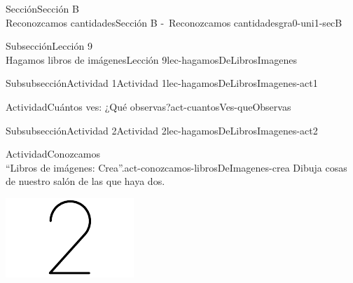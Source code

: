 \begin{sectionptx}{Sección}{{\Large Sección B\\}Reconozcamos cantidades}{}{Sección B -~Reconozcamos cantidades}{}{}{gra0-uni1-secB}
\begin{subsectionptx}{Subsección}{{\normalsize Lección 9\\[-0.05cm]}Hagamos libros de imágenes}{}{Lección 9}{}{}{lec-hagamosDeLibrosImagenes}
\begin{subsubsectionptx}{Subsubsección}{Actividad 1}{}{Actividad 1}{}{}{lec-hagamosDeLibrosImagenes-act1}
\begin{activity}{Actividad}{Cuántos ves: ¿Qué observas?}{act-cuantosVes-queObservas}
\begin{sidebyside}{2}{0}{0}{0}
\begin{sbspanel}{0.5}
\end{sbspanel}%
\end{sidebyside}%
\end{activity}%
\end{subsubsectionptx}
%
%
\typeout{************************************************}
\typeout{************************************************}
%
\begin{subsubsectionptx}{Subsubsección}{Actividad 2}{}{Actividad 2}{}{}{lec-hagamosDeLibrosImagenes-act2}
\begin{activity}{Actividad}{Conozcamos\\“Libros de imágenes: Crea”.}{act-conozcamos-librosDeImagenes-crea}%
Dibuja cosas de nuestro salón de las que haya dos.%
\begin{sidebyside}{2}{0.3}{0.3}{0}%
\begin{sbspanel}{0.2}%
\includegraphics[max width=\linewidth, center]{external/svg-source/tikz-file-148155.pdf}
\end{sbspanel}%
\begin{sbspanel}{0.2}%

\end{sbspanel}
\end{sidebyside}
\end{activity}
\end{subsubsectionptx}
\end{subsectionptx}
\end{sectionptx}
